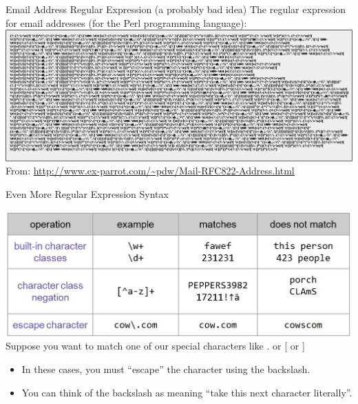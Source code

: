 \documentclass[aspectratio=169]{../latex_main/tntbeamer}  %
\begin{document}
	
	\begin{frame}{Email Address Regular Expression (a probably bad idea)}
	    The regular expression for email addresses (for the Perl programming language):\\
	    \includegraphics[scale=.58]{Bild15}\\
	    From: \url{http://www.ex-parrot.com/~pdw/Mail-RFC822-Address.html}

	\end{frame}
	
	
	\begin{frame}{Even More Regular Expression Syntax}
	    
	    \includegraphics[scale=.45]{Bild16}\\
	    Suppose you want to match one of our special characters like . or [ or ] 
	    \begin{itemize}
	        \item In these cases, you must “escape” the character using the backslash.
	        \item You can think of the backslash as meaning “take this next character literally”.
	    \end{itemize}

	\end{frame}
	
	
	
\end{document}
